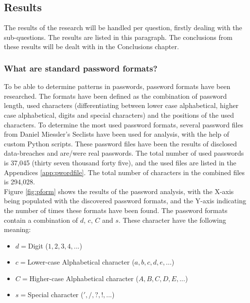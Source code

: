 \documentclass[a4paper,12pt]{article}
\begin{document}
\subsection{Results}

The results of the research will be handled per question, firstly dealing with the sub-questions. The results are listed in this paragraph. The conclusions from these results will be dealt with in the Conclusions chapter.

\subsubsection{What are standard password formats?}

To be able to determine patterns in passwords, password formats have been researched. The formats have been defined as the combination of password length, used characters (differentiating between lower case alphabetical, higher case alphabetical, digits and special characters) and the positions of the used characters. To determine the most used password formats, several password files from Daniel Miessler's Seclists \cite{bib:seclists} have been used for analysis, with the help of custom Python scripts. These password files have been the results of disclosed data-breaches and are/were real passwords. The total number of used passwords is 37,045 (thirty seven thousand forty five), and the used files are listed in the Appendices \ref{app:pwordfile}. The total number of characters in the combined files is 294,028.\\

Figure \ref{fig:pform} shows the results of the password analysis, with the X-axis being populated with the discovered password formats, and the Y-axis indicating the number of times these formats have been found. The password formats contain a combination of $d$, $c$, $C$ and $s$. These character have the following meaning:
\begin{itemize}
\item $d=$Digit ($1,2,3,4,...$)
\item $c=$Lower-case Alphabetical character ($a,b,c,d,e,...$)
\item $C=$Higher-case Alphabetical character ($A,B,C,D,E,...$)
\item $s=$Special character ($',/,?,!,...$)
\end{itemize}
\end{document}
